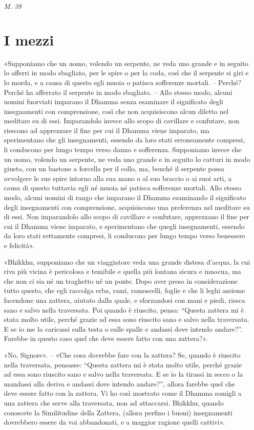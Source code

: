 \emph{M. 38}


\hypertarget{x-i-mezzi}{\section*{I mezzi}}
«Supponiamo che un uomo, volendo un serpente, ne veda uno grande e in
seguito lo afferri in modo sbagliato, per le spire o per la coda, così
che il serpente si giri e lo morda, e a causa di questo egli muoia o
patisca sofferenze mortali. – Perché? Perché ha afferrato il serpente in
modo sbagliato. – Allo stesso modo, alcuni uomini fuorviati imparano il
Dhamma senza esaminare il significato degli insegnamenti con
comprensione, così che non acquisiscono alcun diletto nel meditare su di
essi. Imparandolo invece allo scopo di cavillare e confutare, non
riescono ad apprezzare il fine per cui il Dhamma viene imparato, ma
sperimentano che gli insegnamenti, essendo da loro stati erroneamente
compresi, li conducono per lungo tempo verso danno e sofferenza.
Supponiamo invece che un uomo, volendo un serpente, ne veda uno grande e
in seguito lo catturi in modo giusto, con un bastone a forcella per il
collo, ma, benché il serpente possa avvolgere le sue spire intorno alla
sua mano o al suo braccio o ai suoi arti, a causa di questo tuttavia
egli né muoia né patisca sofferenze mortali. Allo stesso modo, alcuni
uomini di rango che imparano il Dhamma esaminando il significato degli
insegnamenti con comprensione, acquisiscono una preferenza nel meditare
su di essi. Non imparandolo allo scopo di cavillare e confutare,
apprezzano il fine per cui il Dhamma viene imparato, e sperimentano che
quegli insegnamenti, essendo da loro stati rettamente compresi, li
conducono per lungo tempo verso benessere e felicità».


«Bhikkhu, supponiamo che un viaggiatore veda una grande distesa d’acqua,
la cui riva più vicina è pericolosa e temibile e quella più lontana
sicura e innocua, ma che non ci sia né un traghetto né un ponte. Dopo
aver preso in considerazione tutto questo, che egli raccolga erba, rami,
ramoscelli, foglie e che li leghi assieme facendone una zattera, aiutato
dalla quale, e sforzandosi con mani e piedi, riesca sano e salvo nella
traversata. Poi quando è riuscito, pensa: “Questa zattera mi è stata
molto utile, perché grazie ad essa sono riuscito sano e salvo nella
traversata. E se io me la caricassi sulla testa o sulle spalle e andassi
dove intendo andare?”. Farebbe in questo caso quel che deve essere fatto
con una zattera?».


«No, Signore». – «Che cosa dovrebbe fare con la zattera? Se, quando è
riuscito nella traversata, pensasse: “Questa zattera mi è stata molto
utile, perché grazie ad essa sono riuscito sano e salvo nella
traversata. E se io la tirassi in secco o la mandassi alla deriva e
andassi dove intendo andare?”, allora farebbe quel che deve essere fatto
con la zattera. Vi ho così mostrato come il Dhamma somigli a una zattera
che serve alla traversata, non ad attaccarsi. Bhikkhu, quando conoscete
la Similitudine della Zattera, (allora perfino i buoni) insegnamenti
dovrebbero essere da voi abbandonati, e a maggior ragione quelli
cattivi».


